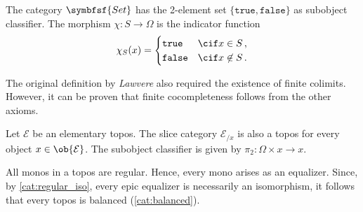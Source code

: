     \begin{example}
        The category $\symbfsf{Set}$ has the 2-element set $\{\texttt{true},\texttt{false}\}$ as subobject classifier. The morphism $\chi:S\rightarrow\Omega$ is the indicator function
        \begin{gather}
            \chi_S(x)=
            \begin{cases}
                \texttt{true}&\cif x\in S\,,\\
                \texttt{false}&\cif x\not\in S\,.
            \end{cases}
        \end{gather}
    \end{example}

    \begin{remark}
        The original definition by \textit{Lawvere} also required the existence of finite colimits. However, it can be proven that finite cocompleteness follows from the other axioms.
    \end{remark}

    \begin{theorem}
        Let $\mathcal{E}$ be an elementary topos. The slice category $\mathcal{E}_{/x}$ is also a topos for every object $x\in\ob{\mathcal{E}}$. The subobject classifier is given by $\pi_2:\Omega\times x\rightarrow x$.
    \end{theorem}

    \begin{property}[Balanced]
        All monos in a topos are regular. Hence, every mono arises as an equalizer. Since, by \cref{cat:regular_iso}, every epic equalizer is necessarily an isomorphism, it follows that every topos is balanced (\cref{cat:balanced}).
    \end{property}

